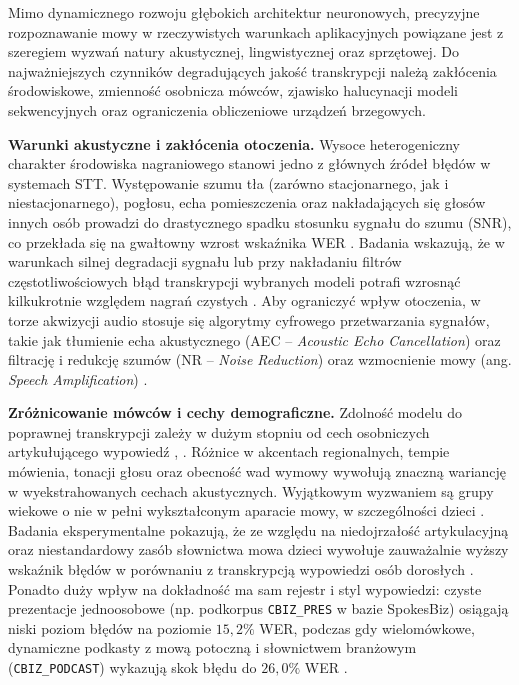 Mimo dynamicznego rozwoju głębokich architektur neuronowych, precyzyjne rozpoznawanie mowy w rzeczywistych warunkach aplikacyjnych powiązane jest z szeregiem wyzwań natury akustycznej, lingwistycznej oraz sprzętowej. Do najważniejszych czynników degradujących jakość transkrypcji należą zakłócenia środowiskowe, zmienność osobnicza mówców, zjawisko halucynacji modeli sekwencyjnych oraz ograniczenia obliczeniowe urządzeń brzegowych.

\textbf{Warunki akustyczne i zakłócenia otoczenia.} Wysoce heterogeniczny charakter środowiska nagraniowego stanowi jedno z głównych źródeł błędów w systemach STT. Występowanie szumu tła (zarówno stacjonarnego, jak i niestacjonarnego), pogłosu, echa pomieszczenia oraz nakładających się głosów innych osób prowadzi do drastycznego spadku stosunku sygnału do szumu (SNR), co przekłada się na gwałtowny wzrost wskaźnika WER \cite[s.~1--2, 5--7]{ferraro2023benchmarking}. Badania wskazują, że w warunkach silnej degradacji sygnału lub przy nakładaniu filtrów częstotliwościowych błąd transkrypcji wybranych modeli potrafi wzrosnąć kilkukrotnie względem nagrań czystych \cite[s.~319]{pondel2024e2e}. Aby ograniczyć wpływ otoczenia, w torze akwizycji audio stosuje się algorytmy cyfrowego przetwarzania sygnałów, takie jak tłumienie echa akustycznego (AEC -- \textit{Acoustic Echo Cancellation}) oraz filtrację i redukcję szumów (NR -- \textit{Noise Reduction}) oraz wzmocnienie mowy (ang. \textit{Speech Amplification}) \cite[s.~18, 215]{pudo2024optimizing}.

\textbf{Zróżnicowanie mówców i cechy demograficzne.} Zdolność modelu do poprawnej transkrypcji zależy w dużym stopniu od cech osobniczych artykułującego wypowiedź \cite[s.~317]{chlewicki2024potencjal}, \cite[s.~4]{pezik2023spokesbiz}. Różnice w akcentach regionalnych, tempie mówienia, tonacji głosu oraz obecność wad wymowy wywołują znaczną wariancję w wyekstrahowanych cechach akustycznych. Wyjątkowym wyzwaniem są grupy wiekowe o nie w pełni wykształconym aparacie mowy, w szczególności dzieci \cite[s.~317]{chlewicki2024potencjal}. Badania eksperymentalne pokazują, że ze względu na niedojrzałość artykulacyjną oraz niestandardowy zasób słownictwa mowa dzieci wywołuje zauważalnie wyższy wskaźnik błędów w porównaniu z transkrypcją wypowiedzi osób dorosłych \cite[s.~317--318]{chlewicki2024potencjal}. Ponadto duży wpływ na dokładność ma sam rejestr i styl wypowiedzi: czyste prezentacje jednoosobowe (np. podkorpus \texttt{CBIZ\_PRES} w bazie SpokesBiz) osiągają niski poziom błędów na poziomie $15{,}2\%$ WER, podczas gdy wielomówkowe, dynamiczne podkasty z mową potoczną i słownictwem branżowym (\texttt{CBIZ\_PODCAST}) wykazują skok błędu do $26{,}0\%$ WER \cite[s.~4]{pezik2023spokesbiz}.

